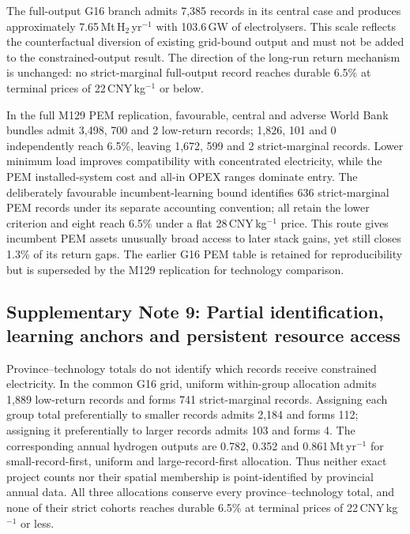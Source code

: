 \documentclass[pdflatex,sn-nature]{sn-jnl}
\begin{document}
The full-output G16 branch admits 7,385 records in its central case and produces approximately 7.65\,Mt\,H$_2$\,yr$^{-1}$ with 103.6\,GW of electrolysers. This scale reflects the counterfactual diversion of existing grid-bound output and must not be added to the constrained-output result. The direction of the long-run return mechanism is unchanged: no strict-marginal full-output record reaches durable 6.5\% at terminal prices of 22\,CNY\,kg$^{-1}$ or below.

In the full M129 PEM replication, favourable, central and adverse World Bank bundles admit 3,498, 700 and 2 low-return records; 1,826, 101 and 0 independently reach 6.5\%, leaving 1,672, 599 and 2 strict-marginal records. Lower minimum load improves compatibility with concentrated electricity, while the PEM installed-system cost and all-in OPEX ranges dominate entry. The deliberately favourable incumbent-learning bound identifies 636 strict-marginal PEM records under its separate accounting convention; all retain the lower criterion and eight reach 6.5\% under a flat 28\,CNY\,kg$^{-1}$ price. This route gives incumbent PEM assets unusually broad access to later stack gains, yet still closes 1.3\% of its return gaps. The earlier G16 PEM table is retained for reproducibility but is superseded by the M129 replication for technology comparison.

\subsection*{Supplementary Note 9: Partial identification, learning anchors and persistent resource access}

Province--technology totals do not identify which records receive constrained electricity. In the common G16 grid, uniform within-group allocation admits 1,889 low-return records and forms 741 strict-marginal records. Assigning each group total preferentially to smaller records admits 2,184 and forms 112; assigning it preferentially to larger records admits 103 and forms 4. The corresponding annual hydrogen outputs are 0.782, 0.352 and 0.861\,Mt\,yr$^{-1}$ for small-record-first, uniform and large-record-first allocation. Thus neither exact project counts nor their spatial membership is point-identified by provincial annual data. All three allocations conserve every province--technology total, and none of their strict cohorts reaches durable 6.5\% at terminal prices of 22\,CNY\,kg$^{-1}$ or less.
\end{document}

